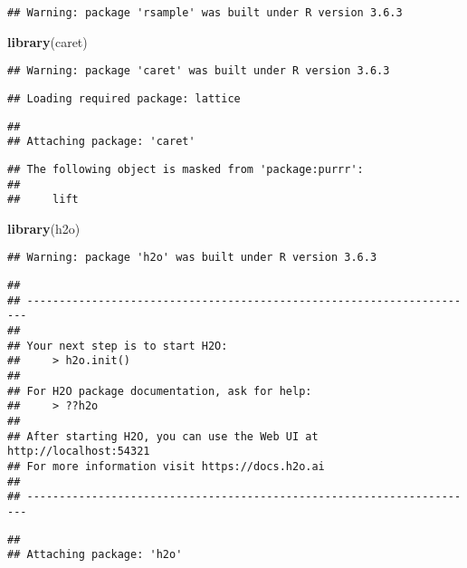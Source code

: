 \documentclass[
]{article}
\newenvironment{Shaded}{\begin{snugshade}}{\end{snugshade}}
\newcommand{\KeywordTok}[1]{\textcolor[rgb]{0.13,0.29,0.53}{\textbf{#1}}}
\newcommand{\NormalTok}[1]{#1}
\begin{document}
\begin{verbatim}
## Warning: package 'rsample' was built under R version 3.6.3
\end{verbatim}

\begin{Shaded}
\begin{Highlighting}[]
\KeywordTok{library}\NormalTok{(caret)}
\end{Highlighting}
\end{Shaded}

\begin{verbatim}
## Warning: package 'caret' was built under R version 3.6.3
\end{verbatim}

\begin{verbatim}
## Loading required package: lattice
\end{verbatim}

\begin{verbatim}
## 
## Attaching package: 'caret'
\end{verbatim}

\begin{verbatim}
## The following object is masked from 'package:purrr':
## 
##     lift
\end{verbatim}

\begin{Shaded}
\begin{Highlighting}[]
\KeywordTok{library}\NormalTok{(h2o)}
\end{Highlighting}
\end{Shaded}

\begin{verbatim}
## Warning: package 'h2o' was built under R version 3.6.3
\end{verbatim}

\begin{verbatim}
## 
## ----------------------------------------------------------------------
## 
## Your next step is to start H2O:
##     > h2o.init()
## 
## For H2O package documentation, ask for help:
##     > ??h2o
## 
## After starting H2O, you can use the Web UI at http://localhost:54321
## For more information visit https://docs.h2o.ai
## 
## ----------------------------------------------------------------------
\end{verbatim}

\begin{verbatim}
## 
## Attaching package: 'h2o'
\end{verbatim}
\end{document}

